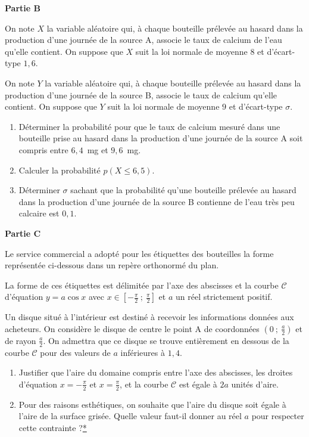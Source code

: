 \documentclass[12pt,frenchb]{article}
\begin{document}
\bigskip

\textbf{Partie B}

\medskip

On note $X$ la variable aléatoire qui, à chaque bouteille prélevée au hasard dans la production d'une journée de la source A, associe le taux de calcium de l'eau qu'elle contient. On suppose que $X$ suit la loi normale de moyenne $8$ et d'écart-type $1,6$.

On note $Y$ la variable aléatoire qui, à chaque bouteille prélevée au hasard dans la production d'une journée de la source B, associe le taux de calcium qu'elle contient. On suppose que $Y$ suit la loi normale de moyenne $9$ et d'écart-type $\sigma$.

\medskip

\begin{enumerate}
\item Déterminer la probabilité pour que le taux de calcium mesuré dans une bouteille
prise au hasard dans la production d'une journée de la source A soit compris entre
$6,4$~mg et $9,6$~mg.
\item Calculer la probabilité $p(X \leqslant 6,5)$.
\item Déterminer $\sigma$ sachant que la probabilité qu'une bouteille prélevée au hasard dans la production d'une journée de la source B contienne de l'eau très peu calcaire est
$0,1$.
\end{enumerate}

\bigskip

\textbf{Partie C}

\medskip

Le service commercial a adopté pour les étiquettes des bouteilles la forme représentée ci-dessous dans un repère orthonormé du plan.

La forme de ces étiquettes est délimitée par l'axe des abscisses et la courbe $\mathcal{C}$ d'équation $y = a\cos x$ avec $x \in  \left[- \frac{\pi}{2}~;~\frac{\pi}{2}\right]$ et $a$ un réel strictement positif.

\smallskip

Un disque situé à l'intérieur est destiné à recevoir les informations données aux acheteurs. On
considère le disque de centre le point A de coordonnées $\left(0~;~\frac{a}{2}\right)$ et de rayon $\frac{a}{2}$. On admettra que ce disque se trouve entièrement en dessous de la courbe $\mathcal{C}$ pour des valeurs de $a$ inférieures à $1,4$.

\medskip

\begin{enumerate}
\item Justifier que l'aire du domaine compris entre l'axe des abscisses, les droites d'équation
$x = - \frac{\pi}{2}$ et $x =  \frac{\pi}{2}$, et la courbe $\mathcal{C}$ est égale à $2a$ unités d'aire.
\item Pour des raisons esthétiques, on souhaite que l'aire du disque soit égale à l'aire de la surface grisée. Quelle valeur faut-il donner au réel $a$ pour respecter cette contrainte ?\hyperlink{Index}{*}
\end{enumerate}
\end{document}
